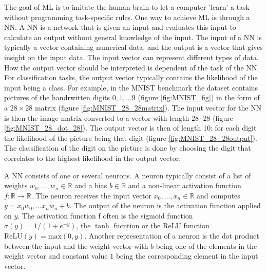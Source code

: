 \documentclass[../thesis.tex]{subfiles}
\begin{document}
The goal of ML is to imitate the human brain to let a computer 'learn' a task without programming task-specific rules. One way to achieve ML is through a NN. A NN is a network that is given an input and evaluates this input to calculate an output without general knowledge of the input. The input of a NN is typically a vector containing numerical data, and the output is a vector that gives insight on the input data. The input vector can represent different types of data. How the output vector should be interpreted is dependent of the task of the NN. For classification tasks, the output vector typically contains the likelihood of the input being a class. For example, in the MNIST benchmark \parencite{lecun1998} the dataset contains pictures of the handrwitten digits $0, 1, ... 9$ (figure \ref{fig:MNIST_fig}) in the form of a $28 \times 28$ matrix (figure \ref{fig:MNIST_28_28matrix}). The input vector for the NN is then the image matrix converted to a vector with length $28 \cdot 28$ (figure \ref{fig:MNIST_28_dot_28}). The output vector is then of length 10: for each digit the likelihood of the picture being that digit (figure \ref{fig:MNIST_28_28output}). The classification of the digit on the picture is done by choosing the digit that correlates to the highest likelihood in the output vector.

A NN consists of one or several neurons. A neuron typically consist of a list of weights $w_0, ..., w_n \in \mathbb{R}$ and a bias $b \in \mathbb{R}$ and a non-linear activation function $f: \mathbb{R} \to \mathbb{R}$. The neuron receives the input vector $x_0, ..., x_n \in \mathbb{R}$ and computes $y = x_0w_0, ... x_nw_n + b$. The output of the neuron is the activation function applied on $y$. The activation function f often is the sigmoid function $\sigma (y) = 1/(1+e^{-y})$, the $\tanh$ fucntion or the ReLU function $\textrm{ReLU}(y) = \textrm{max}(0,y)$. Another representation of a neuron is the dot product between the input and the weight vector with $b$ being one of the elements in the weight vector and constant value $1$ being the corresponding element in the input vector. 
\end{document}
